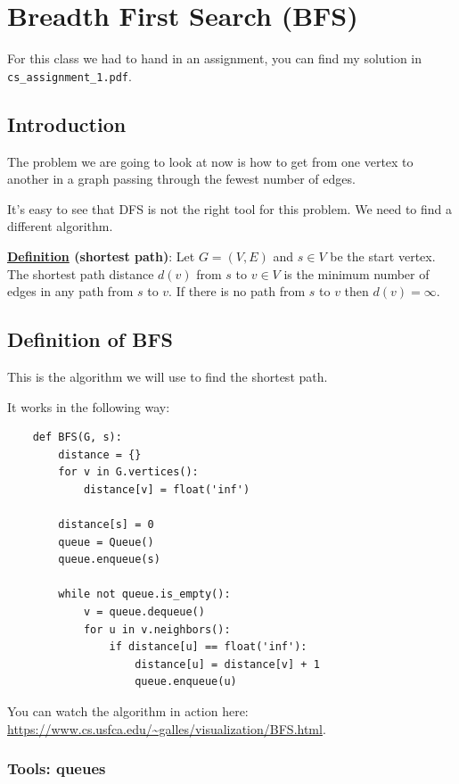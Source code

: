 \documentclass[12pt]{extarticle}
\begin{document}
\section{Breadth First Search (BFS)}

For this class we had to hand in an assignment,
you can find my solution in \texttt{cs\_assignment\_1.pdf}.

\subsection{Introduction}

The problem we are going to look at now is how to get from one vertex to another in a graph passing through the fewest number of edges.

It's easy to see that DFS is not the right tool for this problem. We need to find a different algorithm.

\textbf{\underline{Definition} (shortest path)}:
Let $G = (V, E)$ and $s \in V$ be the start vertex.
The shortest path distance $d(v)$ from $s$ to $v \in V$ is the minimum number of edges in any path from $s$ to $v$.
If there is no path from $s$ to $v$ then $d(v) = \infty$.

\subsection{Definition of BFS}

This is the algorithm we will use to find the shortest path.

It works in the following way:

\begin{verbatim}
    def BFS(G, s):
        distance = {}
        for v in G.vertices():
            distance[v] = float('inf')

        distance[s] = 0
        queue = Queue()
        queue.enqueue(s)

        while not queue.is_empty():
            v = queue.dequeue()
            for u in v.neighbors():
                if distance[u] == float('inf'):
                    distance[u] = distance[v] + 1
                    queue.enqueue(u)
\end{verbatim}

You can watch the algorithm in action here: \url{https://www.cs.usfca.edu/~galles/visualization/BFS.html}.

\subsubsection{Tools: queues}
\end{document}
